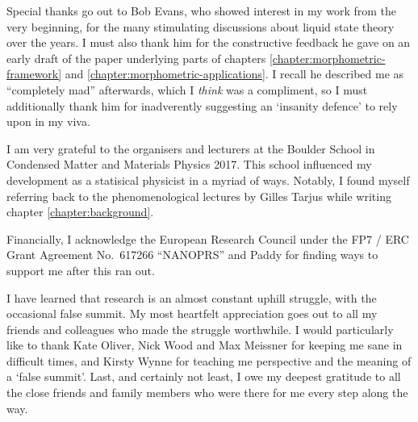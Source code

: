Special thanks go out to Bob Evans, who showed interest in my work from the very beginning, for the many stimulating discussions about liquid state theory over the years.
I must also thank him for the constructive feedback he gave on an early draft of the paper underlying parts of chapters \ref{chapter:morphometric-framework} and \ref{chapter:morphometric-applications}.
I recall he described me as ``completely mad'' afterwards, which I \emph{think} was a compliment, so I must additionally thank him for inadverently suggesting an `insanity defence' to rely upon in my viva.

I am very grateful to the organisers and lecturers at the Boulder School in Condensed Matter and Materials Physics 2017.
This school influenced my development as a statisical physicist in a myriad of ways.
Notably, I found myself referring back to the phenomenological lectures by Gilles Tarjus while writing chapter \ref{chapter:background}.

Financially, I acknowledge the European Research Council under the FP7 / ERC Grant Agreement No.\ 617266 ``NANOPRS'' and Paddy for finding ways to support me after this ran out.

I have learned that research is an almost constant uphill struggle, with the occasional false summit.
My most heartfelt appreciation goes out to all my friends and colleagues who made the struggle worthwhile.
I would particularly like to thank Kate Oliver, Nick Wood and Max Meissner for keeping me sane in difficult times, and Kirsty Wynne for teaching me perspective and the meaning of a `false summit'.
Last, and certainly not least, I owe my deepest gratitude to all the close friends and family members who were there for me every step along the way.

